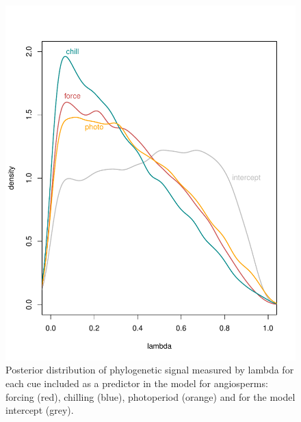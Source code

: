 \documentclass{article}\usepackage[]{graphicx}\usepackage[]{color}
\begin{document}
\begin{figure} [H]
  \begin{center}
  \includegraphics[width=14cm]{..//..//analyses/phylogeny/figures/lambdas_density_gymno.pdf}
  \caption{Posterior distribution of phylogenetic signal measured by lambda for each cue included as a predictor in the model for angiosperms: forcing (red), chilling (blue),  photoperiod (orange) and for the model intercept (grey).}
  \label{fig:pphylosig_gymno}
  \end{center}
\end{figure}
\end{document}
